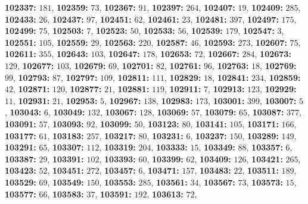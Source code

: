 \textsf{\bfseries 102337:} $181$, \textsf{\bfseries 102359:} $73$, \textsf{\bfseries 102367:} $91$, \textsf{\bfseries 102397:} $264$, \textsf{\bfseries 102407:} $19$, \textsf{\bfseries 102409:} $285$, \textsf{\bfseries 102433:} $26$, \textsf{\bfseries 102437:} $97$, \textsf{\bfseries 102451:} $62$, \textsf{\bfseries 102461:} $23$, \textsf{\bfseries 102481:} $397$, \textsf{\bfseries 102497:} $175$, \textsf{\bfseries 102499:} $75$, \textsf{\bfseries 102503:} $7$, \textsf{\bfseries 102523:} $50$, \textsf{\bfseries 102533:} $56$, \textsf{\bfseries 102539:} $179$, \textsf{\bfseries 102547:} $3$, \textsf{\bfseries 102551:} $105$, \textsf{\bfseries 102559:} $29$, \textsf{\bfseries 102563:} $220$, \textsf{\bfseries 102587:} $46$, \textsf{\bfseries 102593:} $273$, \textsf{\bfseries 102607:} $75$, \textsf{\bfseries 102611:} $355$, \textsf{\bfseries 102643:} $103$, \textsf{\bfseries 102647:} $178$, \textsf{\bfseries 102653:} $72$, \textsf{\bfseries 102667:} $284$, \textsf{\bfseries 102673:} $129$, \textsf{\bfseries 102677:} $103$, \textsf{\bfseries 102679:} $69$, \textsf{\bfseries 102701:} $82$, \textsf{\bfseries 102761:} $96$, \textsf{\bfseries 102763:} $18$, \textsf{\bfseries 102769:} $99$, \textsf{\bfseries 102793:} $87$, \textsf{\bfseries 102797:} $109$, \textsf{\bfseries 102811:} $111$, \textsf{\bfseries 102829:} $18$, \textsf{\bfseries 102841:} $234$, \textsf{\bfseries 102859:} $42$, \textsf{\bfseries 102871:} $120$, \textsf{\bfseries 102877:} $21$, \textsf{\bfseries 102881:} $119$, \textsf{\bfseries 102911:} $7$, \textsf{\bfseries 102913:} $123$, \textsf{\bfseries 102929:} $11$, \textsf{\bfseries 102931:} $21$, \textsf{\bfseries 102953:} $5$, \textsf{\bfseries 102967:} $138$, \textsf{\bfseries 102983:} $173$, \textsf{\bfseries 103001:} $399$, \textsf{\bfseries 103007:} $5$, \textsf{\bfseries 103043:} $6$, \textsf{\bfseries 103049:} $132$, \textsf{\bfseries 103067:} $128$, \textsf{\bfseries 103069:} $57$, \textsf{\bfseries 103079:} $65$, \textsf{\bfseries 103087:} $377$, \textsf{\bfseries 103091:} $57$, \textsf{\bfseries 103093:} $92$, \textsf{\bfseries 103099:} $50$, \textsf{\bfseries 103123:} $80$, \textsf{\bfseries 103141:} $105$, \textsf{\bfseries 103171:} $166$, \textsf{\bfseries 103177:} $61$, \textsf{\bfseries 103183:} $257$, \textsf{\bfseries 103217:} $80$, \textsf{\bfseries 103231:} $6$, \textsf{\bfseries 103237:} $150$, \textsf{\bfseries 103289:} $149$, \textsf{\bfseries 103291:} $65$, \textsf{\bfseries 103307:} $112$, \textsf{\bfseries 103319:} $204$, \textsf{\bfseries 103333:} $15$, \textsf{\bfseries 103349:} $88$, \textsf{\bfseries 103357:} $6$, \textsf{\bfseries 103387:} $29$, \textsf{\bfseries 103391:} $102$, \textsf{\bfseries 103393:} $60$, \textsf{\bfseries 103399:} $62$, \textsf{\bfseries 103409:} $126$, \textsf{\bfseries 103421:} $265$, \textsf{\bfseries 103423:} $52$, \textsf{\bfseries 103451:} $272$, \textsf{\bfseries 103457:} $6$, \textsf{\bfseries 103471:} $157$, \textsf{\bfseries 103483:} $22$, \textsf{\bfseries 103511:} $189$, \textsf{\bfseries 103529:} $69$, \textsf{\bfseries 103549:} $150$, \textsf{\bfseries 103553:} $285$, \textsf{\bfseries 103561:} $34$, \textsf{\bfseries 103567:} $73$, \textsf{\bfseries 103573:} $15$, \textsf{\bfseries 103577:} $66$, \textsf{\bfseries 103583:} $37$, \textsf{\bfseries 103591:} $192$, \textsf{\bfseries 103613:} $72$, 
